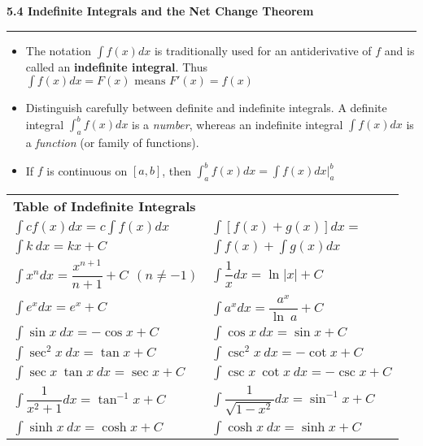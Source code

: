 \documentclass[fleqn]{article}
\begin{document}
\begin{center}
\Large\textbf{5.4 Indefinite Integrals and the Net Change Theorem}

\noindent\hfill\rule{0.3\textwidth}{.4pt}\hfill
\vspace{12pt}
\large

\begin{itemize}
	\item The notation $\int f(x) dx$ is traditionally used for an antiderivative of $f$ and is called an \textbf{indefinite integral}. Thus $\int f(x) dx = F(x) \text{ means } F'(x) = f(x)$
	\item Distinguish carefully between definite and indefinite integrals. A definite integral $\int_a^b f(x) dx$ is a \textit{number}, whereas an indefinite integral $\int f(x) dx$ is a \textit{function} (or family of functions).
	\item If $f$ is continuous on $[a,b]$, then $\int_a^b f(x) dx = \int f(x) dx \big|_a^b$
\end{itemize}
\vspace{24pt}

\def\arraystretch{1.3}
{\setlength{\tabcolsep}{16pt}
\begin{tabularx}{.9\textwidth}{|X X|}
\hline
	\large\textbf{Table of Indefinite Integrals} & \\[5pt]
	$\int cf(x)dx = c \int f(x)dx$ & $\int [f(x) + g(x)]dx =$ \\[10pt]
	$\int k \> dx = kx + C$ & $\int f(x) + \int g(x)dx$ \\[10pt] 
	$\int x^n dx = \dfrac{x^{n+1}}{n+1} + C \hspace{5pt} (n \ne -1)$ & $\int \dfrac{1}{x} dx = \ln|x| + C$ \\[10pt]
	$\int e^x dx = e^x + C$ & $\int a^x dx = \dfrac{a^x}{\ln \> a} + C$ \\[10pt]
	$\int \sin x \> dx = -\cos x + C$ & $\int \cos x \> dx = \sin x +C$ \\[10pt]
	$\int \sec^2x\>dx = \tan x + C$ & $\int \csc^2x\>dx = -\cot x + C$ \\[10pt]
	$\int \sec x\>\tan x\>dx = \sec x +C$ & $\int \csc x\>\cot x\>dx = -\csc x + C$ \\[10pt]
	$\int \dfrac{1}{x^2+1} dx = \tan^{-1}x + C$ & $\int \dfrac{1}{\sqrt{1-x^2}} dx = \sin^{-1} x + C$ \\[10pt]
	$\int \sinh x \> dx = \cosh x + C$ & $\int \cosh x \> dx = \sinh x + C$\\[10pt]
\hline
\end{tabularx}}
\vspace{24pt}


\end{center}
\end{document}
